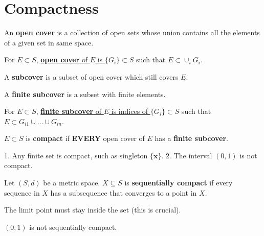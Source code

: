 \section{Compactness}


\begin{definition}
    An \textbf{open cover} is a collection of open sets whose union contains all the elements of a given set in same space.

    For $E \subset S$, \underline{\textbf{open cover} of $E$ is $\{G_i\} \subset S$} such that $E \subset \cup_i G_i$.
\end{definition}



\begin{definition}[Subcover]
    A \textbf{subcover} is a subset of open cover which still covers $E$.
\end{definition}


\begin{definition}
    A \textbf{finite subcover} is a subset with finite elements.

    For $E \subset S$, \underline{\textbf{finite subcover} of $E$ is indices of $\{G_{i}\} \subset S$} such that $E \subset G_{i1}  \cup \dots \cup G_{in}$.
\end{definition}


\begin{definition}
    $E \subset S$ is \textbf{compact} if \textbf{EVERY} open cover of $E$ has a \textbf{finite subcover}.
\end{definition}

\begin{example*}
    1. Any finite set is compact, such as singleton $\{\mathbf{x}\}$. 2. The interval $(0,1)$ is not compact.
\end{example*}

\begin{definition}
    Let $(S,d)$ be a metric space. $X \subseteq S$ is \textbf{sequentially compact} if every sequence in $X$ has a subsequence that converges to a point in $X$.

    \begin{remark*}
        The limit point must stay inside the set (this is crucial).
    \end{remark*}
    \begin{example*}
        $(0,1)$ is not sequentially compact.
    \end{example*}
\end{definition}

